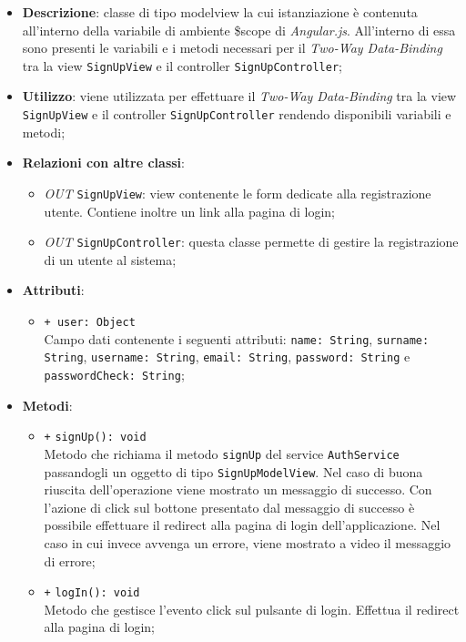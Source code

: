 	\begin{itemize}
		\item \textbf{Descrizione}: classe di tipo modelview la cui istanziazione è contenuta all'interno della variabile di ambiente \$scope di \textit{Angular.js}. All'interno di essa sono presenti le variabili e i metodi necessari per il \textit{Two-Way Data-Binding} tra la view \texttt{SignUpView} e il controller \texttt{SignUpController};
		\item \textbf{Utilizzo}: viene utilizzata per effettuare il \textit{Two-Way Data-Binding} tra la view \texttt{SignUpView} e il controller \texttt{SignUpController} rendendo disponibili variabili e metodi;
		\item \textbf{Relazioni con altre classi}: 
		\begin{itemize}
			\item \textit{OUT} \texttt{SignUpView}: view contenente le form dedicate alla registrazione utente. Contiene inoltre un link alla pagina di login; 
			\item \textit{OUT} \texttt{SignUpController}: questa classe permette di gestire la registrazione di un utente al sistema;
		\end{itemize}
		\item \textbf{Attributi}: 
		\begin{itemize}
			\item \texttt{+ user: Object} \\ Campo dati contenente i seguenti attributi: \texttt{name: String}, \texttt{surname: String}, \texttt{username: String}, \texttt{email: String}, \texttt{password: String} e \texttt{passwordCheck: String};
		\end{itemize}
		\item \textbf{Metodi}: 
		\begin{itemize}
			\item \texttt{+} \texttt{signUp(): void} \\
			Metodo che richiama il metodo \texttt{signUp} del service \texttt{AuthService} passandogli un oggetto di tipo \texttt{SignUpModelView}. Nel caso di buona riuscita dell'operazione viene mostrato un messaggio di successo. Con l'azione di click sul bottone presentato dal messaggio di successo è possibile effettuare il redirect alla pagina di login dell'applicazione. Nel caso in cui invece avvenga un errore, viene mostrato a video il messaggio di errore;
			\item \texttt{+} \texttt{logIn(): void} \\
			Metodo che gestisce l’evento click sul pulsante di login. Effettua il redirect alla pagina di login;
		\end{itemize}
	\end{itemize}
	
	